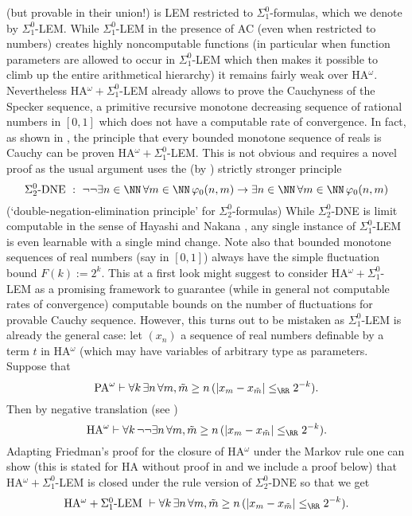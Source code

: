 (but provable in their union!) is LEM restricted to $\Sigma^0_1$-formulas, 
which we denote by $\Sigma^0_1$-LEM. 
While $\Sigma^0_1$-LEM in the presence of 
AC (even when restricted to numbers) 
creates highly noncomputable functions (in particular when function 
parameters are allowed to occur in $\Sigma^0_1$-LEM which then makes it 
possible to climb up the entire arithmetical hierarchy) it remains fairly 
weak over HA$^{\omega}.$ Nevertheless HA$^{\omega}+\Sigma^0_1$-LEM 
already allows 
to prove the Cauchyness of the Specker sequence, a primitive recursive 
monotone decreasing sequence of rational numbers in $[0,1]$ which does not 
have a computable rate of convergence. In fact, as shown in \cite{Toftdal}, 
the principle that every bounded monotone sequence of reals is Cauchy can be 
proven HA$^{\omega}+\Sigma^0_1$-LEM. This is not obvious and requires a novel 
proof as the usual argument uses the (by \cite{Akama}) 
strictly stronger principle 
\[ \Sigma^0_2\mbox{-DNE}\ :\ \neg\neg\exists n\in\NN\,\forall m\in\NN\,
\varphi_0(n,m)\to\exists n\in\NN\,\forall m\in\NN\,\varphi_0(n,m) \]
(`double-negation-elimination principle' for 
$\Sigma^0_2$-formulas) While $\Sigma^0_2$-DNE is limit computable in the 
sense of Hayashi and 
Nakana \cite{Hayashi/Nakata}, 
any single instance of $\Sigma^0_1$-LEM is even learnable 
with a single mind change. Note also that bounded monotone sequences of 
real numbers (say in $[0,1]$) always have the simple fluctuation bound 
$F(k):=2^k.$  
This at a first look might suggest to consider 
HA$^{\omega}+\Sigma^0_1$-LEM as a promising framework to guarantee 
(while in general not computable rates of convergence) computable bounds 
on the number of fluctuations for provable Cauchy sequence. However, this 
turns out to be mistaken as $\Sigma^0_1$-LEM is already the general case: 
let $(x_n)$ a sequence of real numbers definable by a term $t$ 
in HA$^{\omega}$ 
(which may have variables of arbitrary type as parameters. Suppose that 
\[ \mbox{PA}^{\omega}\vdash \forall k\,\exists n\,\forall m,\tilde{m}\ge n\,
(|x_m-x_{\tilde{m}}|\le_{\RR} 2^{-k}). \]
Then by negative translation (see \cite{Kohlenbach08}) 
\[ \mbox{HA}^{\omega}\vdash  \forall k\,\neg\neg 
\exists n\,\forall m,\tilde{m}\ge n\,
(|x_m-x_{\tilde{m}}|\le_{\RR} 2^{-k}). \]
Adapting Friedman's proof for the closure of HA$^{\omega}$ under the Markov 
rule one can show (this is stated for HA without proof in 
\cite{Hayashi/Nakata} and we include a proof below) that HA$^{\omega}+
\Sigma^0_1$-LEM  
is closed under the rule version of $\Sigma^0_2$-DNE so that we get 
\[ \mbox{HA$^{\omega}+\Sigma^0_1$-LEM} \ 
\vdash \forall k\,\exists n\,\forall m,\tilde{m}\ge n\,
(|x_m-x_{\tilde{m}}|\le_{\RR} 2^{-k}). \]
